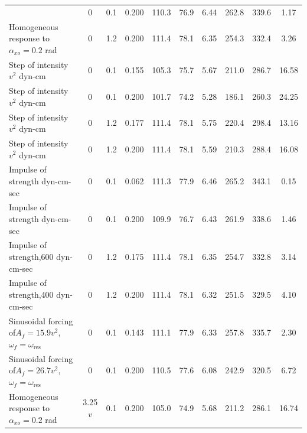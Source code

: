 \begin{longtable}{@{}>{\raggedright\arraybackslash}p{4.1cm}cc
    S[table-format=1.3]S[table-format=3.1]S[table-format=2.1]S[table-format=1.2]
    S[table-format=3.1]S[table-format=3.1]S[table-format=2.2]@{}}
    & 0 & 0.1 & 0.200 & 110.3 & 76.9 & 6.44 & 262.8 & 339.6 & 1.17 \\[2pt]
  Homogeneous response to\newline $\alpha_{xo} = 0.2$ rad
    & 0 & 1.2 & 0.200 & 111.4 & 78.1 & 6.35 & 254.3 & 332.4 & 3.26 \\[2pt]
  Step of intensity$v^{2}$ dyn-cm
    & 0 & 0.1 & 0.155 & 105.3 & 75.7 & 5.67 & 211.0 & 286.7 & 16.58 \\[2pt]
  Step of intensity$v^{2}$ dyn-cm
    & 0 & 0.1 & 0.200 & 101.7 & 74.2 & 5.28 & 186.1 & 260.3 & 24.25 \\[2pt]
  Step of intensity$v^{2}$ dyn-cm
    & 0 & 1.2 & 0.177 & 111.4 & 78.1 & 5.75 & 220.4 & 298.4 & 13.16 \\[2pt]
  Step of intensity$v^{2}$ dyn-cm
    & 0 & 1.2 & 0.200 & 111.4 & 78.1 & 5.59 & 210.3 & 288.4 & 16.08 \\[2pt]
  Impulse of strength dyn-cm-sec
    & 0 & 0.1 & 0.062 & 111.3 & 77.9 & 6.46 & 265.2 & 343.1 & 0.15 \\[2pt]
  Impulse of strength dyn-cm-sec
    & 0 & 0.1 & 0.200 & 109.9 & 76.7 & 6.43 & 261.9 & 338.6 & 1.46 \\[2pt]
  Impulse of strength,600 dyn-cm-sec
    & 0 & 1.2 & 0.175 & 111.4 & 78.1 & 6.35 & 254.7 & 332.8 & 3.14 \\[2pt]
  Impulse of strength,400 dyn-cm-sec
    & 0 & 1.2 & 0.200 & 111.4 & 78.1 & 6.32 & 251.5 & 329.5 & 4.10 \\[2pt]
  Sinusoidal forcing of\newline $A_f = 15.9v^{2}$, $\omega_f = \omega_{\mathrm{res}}$
    & 0 & 0.1 & 0.143 & 111.1 & 77.9 & 6.33 & 257.8 & 335.7 & 2.30 \\[2pt]
  Sinusoidal forcing of\newline $A_f = 26.7v^{2}$, $\omega_f = \omega_{\mathrm{res}}$
    & 0 & 0.1 & 0.200 & 110.5 & 77.6 & 6.08 & 242.9 & 320.5 & 6.72 \\[2pt]
  Homogeneous response to\newline $\alpha_{xo} = 0.2$ rad
    & 3.25$v$ & 0.1 & 0.200 & 105.0 & 74.9 & 5.68 & 211.2 & 286.1 & 16.74 \\[2pt]

\end{longtable}

